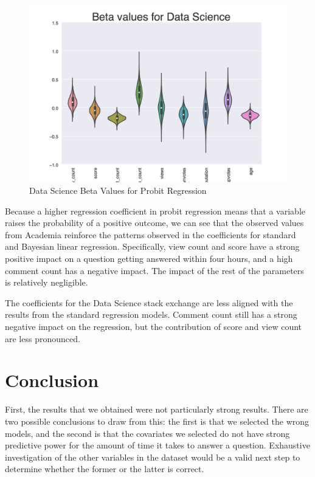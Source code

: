 \documentclass[12pt]{article}
\begin{document}
\begin{figure}[h]
  \centering
  \includegraphics[scale = 0.3]{Data_science_vplot.jpg}
  \caption{Data Science Beta Values for Probit Regression}
  \label{vp_data_science}
\end{figure}

Because a higher regression coefficient in probit regression means that a variable raises the probability of a positive outcome, we can see that the observed values from Academia reinforce the patterns observed in the coefficients for standard and Bayesian linear regression. Specifically, view count and score have a strong positive impact on a question getting answered within four hours, and a high comment count has a negative impact. The impact of the rest of the parameters is relatively negligible. 

The coefficients for the Data Science stack exchange are less aligned with the results from the standard regression models. Comment count still has a strong negative impact on the regression, but the contribution of score and view count are less pronounced.

\section{Conclusion}

First, the results that we obtained were not particularly strong results. There are two possible conclusions to draw from this: the first is that we selected the wrong models, and the second is that the covariates we selected do not have strong predictive power for the amount of time it takes to answer a question. Exhaustive investigation of the other variables in the dataset would be a valid next step to determine whether the former or the latter is correct. 
\end{document}
